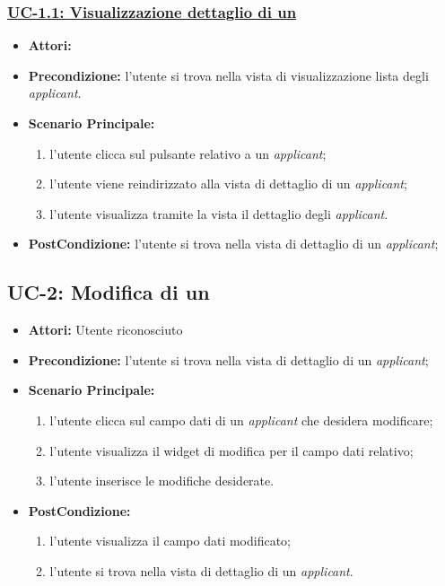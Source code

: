 \subsubsection{\underline{UC-1.1: Visualizzazione dettaglio di un\applicant}}
\begin{itemize}
	\item \textbf{Attori:}\loggedusr
	\item \textbf{Precondizione:} l'utente si trova nella vista di visualizzazione lista degli \textit{applicant}. 
	\item \textbf{Scenario Principale:}
	\begin{enumerate}
		\item l'utente clicca sul pulsante relativo a un \textit{applicant};
		\item l'utente viene reindirizzato alla vista di dettaglio di un \textit{applicant};
		\item l'utente visualizza tramite la vista il dettaglio degli \textit{applicant}.
	\end{enumerate}
	\item \textbf{PostCondizione:} l'utente si trova nella vista di dettaglio di un \textit{applicant};
\end{itemize}


\subsection{UC-2: Modifica di un \applicant}
\begin{itemize}
	\item \textbf{Attori:} Utente riconosciuto
	\item \textbf{Precondizione:}  l'utente si trova nella vista di dettaglio di un \textit{applicant};
	\item \textbf{Scenario Principale:}
	\begin{enumerate}
		\item l'utente clicca sul campo dati di un \textit{applicant} che desidera modificare;
		\item l'utente visualizza il  widget di modifica per il campo dati
		relativo;
		\item l'utente inserisce le modifiche desiderate.
	\end{enumerate}
	\item \textbf{PostCondizione:} 
	\begin{enumerate}
		\item l'utente visualizza il campo dati modificato;
		\item l'utente si trova nella vista di dettaglio di un \textit{applicant}.
	\end{enumerate}
	
\end{itemize}

